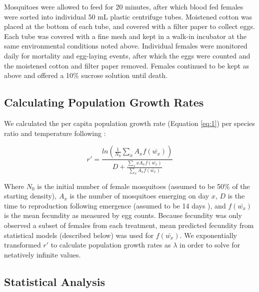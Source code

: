 \documentclass[12pt,]{article}
\begin{document}
Mosquitoes were allowed to feed for 20 minutes, after which blood fed
females were sorted into individual 50 mL plastic centrifuge tubes.
Moistened cotton was placed at the bottom of each tube, and covered with
a filter paper to collect eggs. Each tube was covered with a fine mesh
and kept in a walk-in incubator at the same environmental conditions
noted above. Individual females were monitored daily for mortality and
egg-laying events, after which the eggs were counted and the moistened
cotton and filter paper removed. Females continued to be kept as above
and offered a 10\% sucrose solution until death.

\subsection{Calculating Population Growth
Rates}\label{calculating-population-growth-rates}

We calculated the per capita population growth rate (Equation
\ref{eq:1}) per species ratio and temperature following
\citep{livdahl1984}:

\begin{equation} \label{eq:1}
r' = \frac{ln(\frac{1}{N_0}\sum_{x}^{ }{A_x}f(\bar{w_x}))}{D+\frac{\sum_{x}^{ }xA_xf(\bar{w_x})}{\sum_{x}^{ }A_xf(\bar{w_x})}}
\end{equation}

Where \(N_0\) is the initial number of female mosquitoes (assumed to be
50\% of the starting density), \(A_x\) is the number of mosquitoes
emerging on day \(x\), \(D\) is the time to reproduction following
emergence (assumed to be 14 days \citep{livdahl1991}), and
\(f(\bar{w_x})\) is the mean fecundity as measured by egg counts.
Because fecundity was only observed a subset of females from each
treatment, mean predicted fecundity from statistical models (described
below) was used for \(f(\bar{w_x})\). We exponentially transformed
\(r'\) to calculate population growth rates as \(\lambda\) in order to
solve for netatively infinite values.

\subsection{Statistical Analysis}\label{statistical-analysis}
\end{document}
